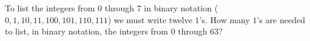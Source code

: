To list the integers from $0$ through $7$ in binary notation ($0,1,10,11,100,101,110,111$) we must write twelve $1$'s. How many $1$'s are needed to list, in binary notation, the integers from $0$ through $63$?
